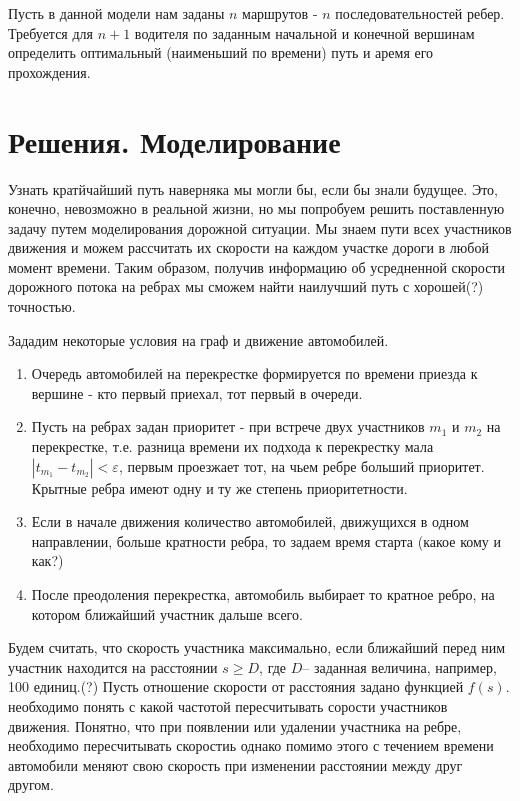 \documentclass[12pt, a4paper]{article}
\begin{document}
Пусть в данной модели нам заданы $ n $ маршрутов - $ n $ последовательностей ребер. Требуется для $ n+1 $ водителя по заданным начальной и конечной вершинам определить оптимальный (наименьший по времени) путь и аремя его прохождения.

\newpage
\section*{Решения. Моделирование}

Узнать кратйчайший путь наверняка мы могли бы, если бы знали будущее. Это, конечно, невозможно в реальной жизни, но мы попробуем решить поставленную задачу путем моделирования дорожной ситуации. Мы знаем пути всех участников движения и можем рассчитать их скорости на каждом участке дороги в любой момент времени. Таким образом, получив информацию об усредненной скорости дорожного потока на ребрах мы сможем найти наилучший путь с хорошей(?) точностью.

Зададим некоторые условия на граф и движение автомобилей. 

\begin{enumerate}
	\item Очередь автомобилей на перекрестке формируется по времени приезда к вершине - кто первый приехал, тот первый в очереди.
	\item Пусть на ребрах задан приоритет - при встрече двух участников $ m_1 $ и $ m_2 $ на перекрестке, т.е. разница времени их подхода к перекрестку мала $ | t_{m_1} - t_{m_2} | < \varepsilon $, первым проезжает тот, на чьем ребре больший приоритет. Крытные ребра имеют одну и ту же степень приоритетности. 
	\item Если в начале движения количество автомобилей, движущихся в одном направлении, больше кратности ребра, то задаем время старта (какое кому и как?)
	\item После преодоления перекрестка, автомобиль выбирает то кратное ребро, на котором ближайший участник дальше всего.
\end{enumerate}

Будем считать, что скорость участника максимально, если ближайший перед ним участник находится на расстоянии $ s \geq D $, где $ D $-- заданная величина, например, 100 единиц.(?) Пусть отношение скорости от расстояния задано функцией $ f(s) $. необходимо понять с какой частотой пересчитывать сорости участников движения. Понятно, что при появлении или удалении участника на ребре, необходимо пересчитывать скоростиь однако помимо этого с течением времени автомобили меняют свою скорость при изменении расстоянии между друг другом.
\end{document}
